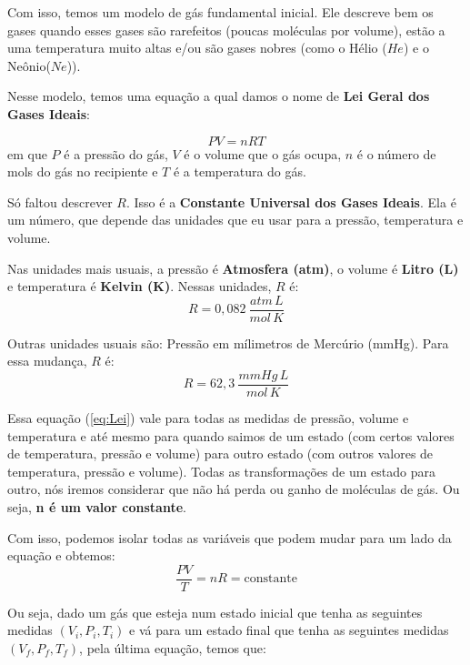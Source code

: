 \documentclass[12pt]{extarticle}
\newcommand{\<}{\langle}
\renewcommand{\>}{\rangle}
\theoremstyle{definition}
\begin{document}
    Com isso, temos um modelo de gás fundamental inicial. Ele descreve bem os gases quando esses gases são rarefeitos (poucas moléculas por volume), estão a uma temperatura muito altas e/ou são gases nobres (como o Hélio ($He$) e o Neônio($Ne$)).
    
    Nesse modelo, temos uma equação a qual damos o nome de \textbf{Lei Geral dos Gases Ideais}:
    
    \begin{equation}\label{eq:Lei}
        P V = n R T
    \end{equation}
em que $P$ é a pressão do gás, $V$ é o volume que o gás ocupa, $n$ é o número de mols do gás no recipiente e $T$ é a temperatura do gás.

Só faltou descrever $R$. Isso é a \textbf{Constante Universal dos Gases Ideais}. Ela é um número, que depende das unidades que eu usar para a pressão, temperatura e volume.

Nas unidades mais usuais, a pressão é \textbf{Atmosfera (atm)}, o volume é \textbf{Litro (L)} e temperatura é \textbf{Kelvin (K)}. Nessas unidades, $R$ é:
\begin{equation}
    R = 0,082 \:\frac{atm\,L}{mol\,K}
\end{equation}

Outras unidades usuais são: Pressão em mílimetros de Mercúrio (mmHg). Para essa mudança, $R$ é:
\begin{equation}
    R = 62,3 \:\frac{mmHg\,L}{mol\,K}
\end{equation}

Essa equação (\eqref{eq:Lei}) vale para todas as medidas de pressão, volume e temperatura e até mesmo para quando saimos de um estado (com certos valores de temperatura, pressão e volume) para outro estado (com outros valores de temperatura, pressão e volume). Todas as transformações de um estado para outro, nós iremos considerar que não há perda ou ganho de moléculas de gás. Ou seja, \textbf{n é um valor constante}.

Com isso, podemos isolar todas as variáveis que podem mudar para um lado da equação e obtemos:
\begin{equation}
    \frac{PV}{T} = nR = \text{constante}
\end{equation}

Ou seja, dado um gás que esteja num estado inicial que tenha as seguintes medidas $(V_i,P_i,T_i)$ e vá para um estado final que tenha as seguintes medidas $(V_f,P_f,T_f)$, pela última equação, temos que:
\end{document}
